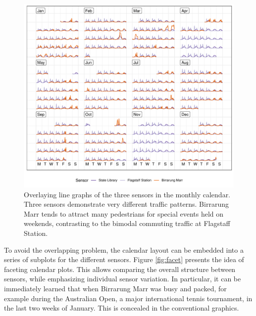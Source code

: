 \documentclass[12pt]{article}
\begin{document}
\begin{figure}

{\centering \includegraphics[width=\textwidth]{figure/overlay-1} 

}

\caption{Overlaying line graphs of the three sensors in the monthly calendar. Three sensors demonstrate very different traffic patterns. Birrarung Marr tends to attract many pedestrians for special events held on weekends, contrasting to the bimodal commuting traffic at Flagstaff Station.}\label{fig:overlay}
\end{figure}

To avoid the overlapping problem, the calendar layout can be embedded
into a series of subplots for the different sensors. Figure
\ref{fig:facet} presents the idea of faceting calendar plots. This
allows comparing the overall structure between sensors, while
emphasizing individual sensor variation. In particular, it can be
immediately learned that when Birrarung Marr was busy and packed, for
example during the Australian Open, a major international tennis
tournament, in the last two weeks of January. This is concealed in the
conventional graphics.
\end{document}
